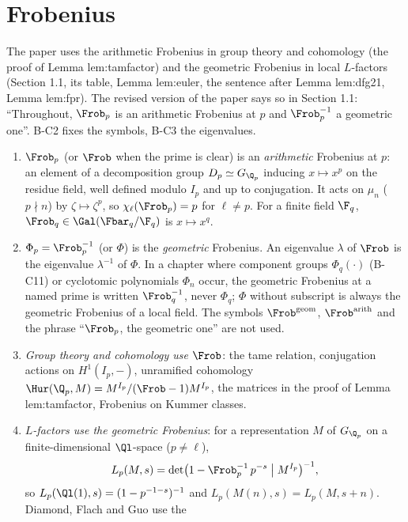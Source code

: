 \section{Frobenius}\label{sec:notation:frobenius}

The paper uses the arithmetic Frobenius in group theory and cohomology (the proof of Lemma lem:tamfactor) and the geometric
Frobenius in local $L$-factors (Section 1.1, its table, Lemma lem:euler, the sentence after Lemma lem:dfg21, Lemma lem:fpr). The
revised version of the paper says so in Section 1.1: ``Throughout, $\Frob_p$ is an arithmetic Frobenius at $p$ and
$\Frob_p^{-1}$ a geometric one''. B-C2 fixes the symbols, B-C3 the eigenvalues.

\begin{convention}\label{conv:notation:bc2}
\leavevmode
\begin{enumerate}[label=(\alph*)]
\item $\Frob_p$ (or $\Frob$ when the prime is clear) is an \emph{arithmetic} Frobenius at $p$: an element of a decomposition
group $D_p\simeq G_{\Q_p}$ inducing $x\mapsto x^p$ on the residue field, well defined modulo $I_p$ and up to conjugation. It acts on
$\mu_n$ ($p\nmid n$) by $\zeta\mapsto\zeta^p$, so $\chi_\ell(\Frob_p)=p$ for $\ell\ne p$. For a finite field $\F_q$,
$\Frob_q\in\Gal(\Fbar_q/\F_q)$ is $x\mapsto x^q$.
\item $\Phi_p=\Frob_p^{-1}$ (or $\Phi$) is the \emph{geometric} Frobenius. An eigenvalue $\lambda$ of $\Frob$ is the eigenvalue
$\lambda^{-1}$ of $\Phi$. In a chapter where component groups $\Phi_q(\cdot)$ (B-C11) or cyclotomic polynomials $\Phi_n$ occur, the
geometric Frobenius at a named prime is written $\Frob_q^{-1}$, never $\Phi_q$; $\Phi$ without subscript is always the geometric
Frobenius of a local field. The symbols $\Frob^{\mathrm{geom}}$, $\Frob^{\mathrm{arith}}$ and the phrase ``$\Frob_p$, the geometric
one'' are not used.
\item \emph{Group theory and cohomology use $\Frob$}: the tame relation, conjugation actions on $H^1(I_p,-)$, unramified
cohomology $\Hur(\Q_p,M)=M^{I_p}/(\Frob-1)M^{I_p}$, the matrices in the proof of Lemma lem:tamfactor, Frobenius on Kummer classes.
\item \emph{$L$-factors use the geometric Frobenius}: for a representation $M$ of $G_{\Q_p}$ on a finite-dimensional
$\Ql$-space ($p\ne\ell$),
\[
L_p(M,s)=\det\bigl(1-\Frob_p^{-1}\,p^{-s}\bigm|M^{I_p}\bigr)^{-1},
\]
so $L_p(\Ql(1),s)=(1-p^{-1-s})^{-1}$ and $L_p(M(n),s)=L_p(M,s+n)$. Diamond, Flach and Guo \cite[1.1.1, 1.7.2]{DFG04} use the

\end{enumerate}
\end{convention}
